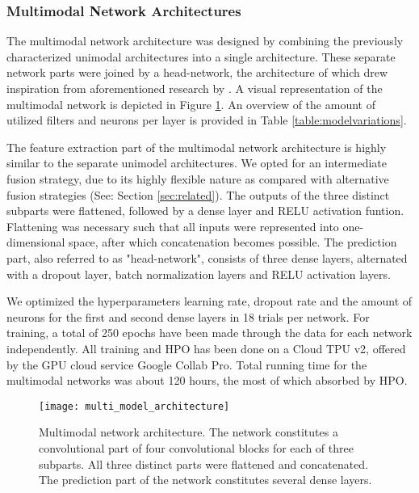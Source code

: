 \documentclass[fleqn,11pt]{paper}
\begin{document}
\subsubsection*{Multimodal Network Architectures} \label{section:multimodal}
The multimodal network architecture was designed by combining the previously characterized unimodal architectures into a single architecture. These separate network parts were joined by a head-network, the architecture of which drew inspiration from aforementioned research by . A visual representation of the multimodal network is depicted in Figure \ref{fig:multiarchitecture}. An overview of the amount of utilized filters and neurons per layer is provided in Table \ref{table:modelvariations}.

The feature extraction part of the multimodal network architecture is highly similar to the separate unimodel architectures. We opted for an intermediate fusion strategy, due to its highly flexible nature as compared with alternative fusion strategies (See: Section \ref{sec:related}). The outputs of the three distinct subparts were flattened, followed by a dense layer and RELU activation funtion. Flattening was necessary such that all inputs were represented into one-dimensional space, after which concatenation becomes possible. The prediction part, also referred to as "head-network", consists of three dense layers, alternated with a dropout layer, batch normalization layers and RELU activation layers.  

We optimized the hyperparameters learning rate, dropout rate and the amount of neurons for the first and second dense layers in 18 trials per network.  For training, a total of 250 epochs have been made through the data for each network independently. All training and HPO has been done on a Cloud TPU v2,  offered by the GPU cloud service Google Collab Pro.  Total running time for the multimodal networks was about 120 hours, the most of which absorbed by HPO. 

\vspace{6mm}
\begin{figure}[h]
\centering
\texttt{[image: multi\_model\_architecture]}
\caption{Multimodal network architecture. The network constitutes a convolutional part of four convolutional blocks for each of three subparts. All three distinct parts were flattened and concatenated. The prediction part of the network constitutes several dense layers.}\label{fig:multiarchitecture}
\end{figure}
\end{document}
